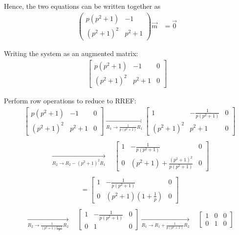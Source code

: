 \documentclass[journal]{IEEEtran}
\begin{document}
Hence, the two equations can be written together as
\begin{align}
\begin{pmatrix}
p(p^2+1) & -1 \\
(p^2+1)^2 & p^2+1
\end{pmatrix}
\vec{m} &= \vec{0}
\end{align}

Writing the system as an augmented matrix:
\begin{align}
\left[
\begin{array}{cc|c}
p(p^2 + 1) & -1 & 0 \\
(p^2 + 1)^2 & p^2 + 1 & 0
\end{array}
\right]
\end{align}


Perform row operations to reduce to RREF:
\begin{align}
& \left[
\begin{array}{cc|c}
p(p^2 + 1) & -1 & 0 \\
(p^2 + 1)^2 & p^2 + 1 & 0
\end{array}
\right]
\xrightarrow[R_1 \to \frac{1}{p(p^2+1)} R_1]{\quad}
\left[
\begin{array}{cc|c}
1 & -\frac{1}{p(p^2+1)} & 0 \\
(p^2 + 1)^2 & p^2 + 1 & 0
\end{array}
\right] \nonumber\\
\end{align}
\begin{align}
& \xrightarrow[R_2 \to R_2 - (p^2 + 1)^2 R_1]{\quad} 
 \quad
\left[
\begin{array}{cc|c}
1 & -\frac{1}{p(p^2+1)} & 0 \\
0 & (p^2 + 1) + \frac{(p^2 + 1)^2}{p(p^2+1)} & 0
\end{array}
\right] \nonumber\\
\end{align}
\begin{align}
&=
\left[
\begin{array}{cc|c}
1 & -\frac{1}{p(p^2+1)} & 0 \\
0 & (p^2 + 1)\left(1 + \frac{1}{p}\right) & 0
\end{array}
\right] \nonumber\\
\end{align}
\begin{align}
& \xrightarrow[R_2 \to \frac{1}{(p^2 + 1)\frac{p+1}{p}} R_2]{\quad} \quad
\left[
\begin{array}{cc|c}
1 & -\frac{1}{p(p^2+1)} & 0 \\
0 & 1 & 0
\end{array}
\right] 
 \xrightarrow[R_1 \to R_1 + \frac{1}{p(p^2+1)} R_2]{\quad} \quad
\left[
\begin{array}{cc|c}
1 & 0 & 0 \\
0 & 1 & 0
\end{array}
\right]
\end{align}
\end{document}
